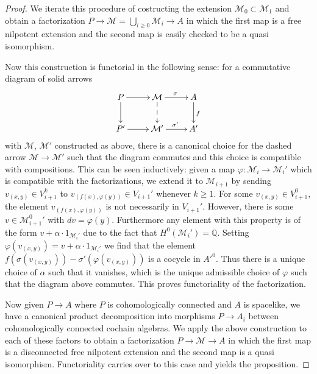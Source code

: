 \documentclass[12pt,a4paper]{article}
\theoremstyle{definition}
\begin{document}
\begin{proof}
We iterate this procedure of costructing the extension $\mathcal{M}_0\subset \mathcal{M}_1$ and obtain a factorization $P\rightarrow \mathcal{M}=\bigcup_{i\geq 0} \mathcal{M}_i\rightarrow A$ in which the first map is a free nilpotent extension and the second map is easily checked to be a quasi isomorphism.

Now this construction is functorial in the following sense: for a commutative diagram of solid arrows
\[\xymatrix{
P\ar[d]\ar[r]& \mathcal{M}\ar@{-->}[d]\ar[r]^{\sigma}& A\ar[d]^f\\
P'\ar[r]&\mathcal{M}'\ar[r]^{\sigma'}& A'
}\]
with $\mathcal{M}$, $\mathcal{M'}$ constructed as above, there is a canonical choice for the dashed arrow $\mathcal{M}\rightarrow \mathcal{M}'$ such that the diagram commutes and this choice is compatible with compositions. This can be seen inductively: given a map $\varphi\colon \mathcal{M}_i\rightarrow \mathcal{M}_i'$ which is compatible with the factorizations, we extend it to $\mathcal{M}_{i+1}$ by sending $v_{(x,y)}\in V^k_{i+1}$ to $v_{(f(x),\varphi(y))}\in V_{i+1}'$ whenever $k\geq 1$. For some $v_{(x,y)}\in V_{i+1}^0$, the element $v_{(f(x),\varphi(y))}$ is not necessarily in $V_{i+1}'$. However, there is some $v\in {\mathcal{M}_{i+1}^0}'$ with $dv=\varphi(y)$. Furthermore any element with this property is of the form $v+\alpha\cdot 1_{\mathcal{M}_i'}$ due to the fact that $H^0(\mathcal{M}_i')=\mathbb{Q}$. Setting $\varphi(v_{(x,y)})= v+\alpha\cdot 1_{\mathcal{M}_i'}$ we find that the element $f(\sigma(v_{(x,y)}))-\sigma'(\varphi(v_{(x,y)}))$ is a cocycle in ${A'}^0$. Thus there is a unique choice of $\alpha$ such that it vanishes, which is the unique admissible choice of $\varphi$ such that the diagram above commutes. This proves functoriality of the factorization.

Now given $P\rightarrow A$ where $P$ is cohomologically connected and $A$ is spacelike, we have a canonical product decomposition into morphisms $P\rightarrow A_i$ between cohomologically connected cochain algebras. We apply the above construction to each of these factors to obtain a factorization $P\rightarrow\mathcal{M}\rightarrow A$ in which the first map is a disconnected free nilpotent extension and the second map is a quasi isomorphism. Functoriality carries over to this case and yields the proposition.
\end{proof}
\end{document}
